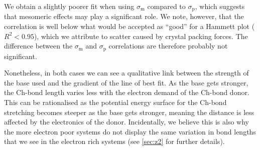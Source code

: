 \begin{refsection}
We obtain a slightly poorer fit when using $\sigma_\text{m}$ compared to $\sigma_\text{p}$, which suggests that mesomeric effects may play a significant role.
We note, however, that the correlation is well below what would be accepted as ``good'' for a Hammett plot ($R^2 < 0.95$)\autocite{Jaffe1953}, which we attribute to scatter caused by crystal packing forces.
The difference between the $\sigma_\text{m}$ and $\sigma_\text{p}$ correlations are therefore probably not significant.

Nonetheless, in both cases we can see a qualitative link between the strength of the base used and the gradient of the line of best fit.
As the base gets stronger, the Ch-bond length varies less with the electron demand of the Ch-bond donor.
This can be rationalised as the potential energy surface for the Ch-bond stretching becomes steeper as the base gets stronger, meaning the distance is less affected by the electronics of the donor.
Incidentally, we believe this is also why the more electron poor systems do not display the same variation in bond lengths that we see in the electron rich systems (see \cref{sec:z2} for further details).


\end{refsection}
